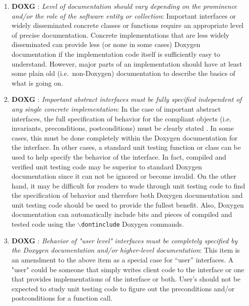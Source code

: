 \begin{enumerate}

{}\item{}\textbf{DOXG }:
{}\textit{Level of documentation should vary depending on the prominence
and/or the role of the software entity or collection}: Important interfaces or
widely disseminated concrete classes or functions require an appropriate level
of precise documentation.  Concrete implementations that are less widely
disseminated can provide less (or none in some cases) Doxygen documentation if
the implementation code itself is sufficiently easy to understand.  However,
major parts of an implementation should have at least some plain old (i.e.\
non-Doxygen) documentation to describe the basics of what is going on.

{}\item{}\textbf{DOXG }:
{}\textit{Important abstract interfaces must be fully specified
independent of any single concrete implementation}: In the case of important
abstract interfaces, the full specification of behavior for the compliant
objects (i.e. invariants, preconditions, postconditions) must be clearly
stated {}\cite[Item 69]{C++CodingStandards05}.  In some cases, this must be
done completely within the Doxygen documentation for the interface.  In other
cases, a standard unit testing function or class can be used to help specify
the behavior of the interface.  In fact, compiled and verified unit testing
code may be superior to standard Doxygen documentation since it can not be
ignored or become invalid.  On the other hand, it may be difficult for readers
to wade through unit testing code to find the specification of behavior and
therefore both Doxygen documentation and unit testing code should be used to
provide the fullest benefit.  Also, Doxygen documentation can automatically
include bits and pieces of compiled and tested code using the
{}\texttt{$\backslash$dontinclude} Doxygen commands.

{}\item{}\textbf{DOXG
}: {}\textit{Behavior of "user level" interfaces
must be completely specified by the Doxygen documentation and/or higher-level
documentation}: This item is an amendment to the above item as a special case
for ``user'' interfaces.  A "user" could be someone that simply writes client
code to the interface or one that provides implementations of the interface or
both.  User's should not be expected to study unit testing code to figure out
the preconditions and/or postconditions for a function call.


\end{enumerate}
